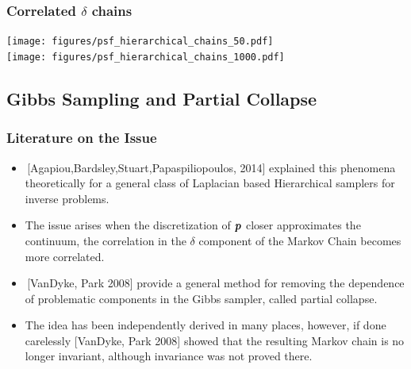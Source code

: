\documentclass[]{beamer}
\newcommand{\bm}[1]{\mbox{\boldmath$#1$}}
\newcommand{\vect}[1]{\bm{#1}}
\begin{document}
\begin{frame}[t]
  \frametitle{Correlated $\delta$ chains}
  \vspace{-1.2em}
  \begin{center}
    \texttt{[image: figures/psf\_hierarchical\_chains\_50.pdf]}\\
    \texttt{[image: figures/psf\_hierarchical\_chains\_1000.pdf]}\\ 
  \end{center}
\end{frame}

\subsection{Gibbs Sampling and Partial Collapse}
\begin{frame}[t]
  \frametitle{Literature on the Issue}
  {\small
  \begin{itemize}
    \itemsep 1.2em
    \item \,[Agapiou,Bardsley,Stuart,Papaspiliopoulos, 2014] explained this phenomena theoretically for a general class of Laplacian based Hierarchical samplers for inverse problems.
    \item The issue arises when the discretization of \alert{$\vect p$} closer approximates the continuum, the correlation in the \alert{$\delta$} component of the Markov Chain becomes more correlated.
    \item \,[VanDyke, Park 2008] provide a general method for removing the dependence of problematic components in the Gibbs sampler, called \alert{partial collapse}.
    \item The idea has been independently derived in many places, however, if done carelessly [VanDyke, Park 2008] showed that the resulting Markov chain is no longer \alert{invariant}, although invariance was not proved there.
  \end{itemize}
  }
\end{frame}
\end{document}
